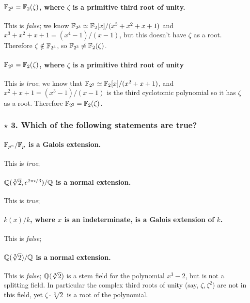 \paragraph*{$\mathbb{F}_{2^3} = \mathbb{F}_{2}(\zeta)$, where $\zeta$ is a primitive third root of unity.} This is \emph{false}; we know $\mathbb{F}_{2^3} \simeq \mathbb{F}_2[x] / (x^3 + x^2 + x + 1)$ and $x^3 + x^2 + x + 1 = (x^4 - 1) / (x - 1)$, but this doesn't have $\zeta$ as a root. Therefore $\zeta \notin \mathbb{F}_{2^3}$, so $\mathbb{F}_{2^3} \neq \mathbb{F}_2(\zeta)$.

\paragraph*{$\mathbb{F}_{2^2} = \mathbb{F}_{2}(\zeta)$, where $\zeta$ is a primitive third root of unity} This is \emph{true}; we know that $\mathbb{F}_{2^2} \simeq \mathbb{F}_2[x] / (x^2 + x + 1)$, and $x^2 + x + 1 = (x^3 - 1) / (x - 1)$ is the third cyclotomic polynomial so it has $\zeta$ as a root. Therefore $\mathbb{F}_{2^2} = \mathbb{F}_2(\zeta)$.

\subsubsection*{$\star$ 3. Which of the following statements are true?}
\paragraph*{$\mathbb{F}_{p^n} / \mathbb{F}_p$ is a Galois extension.} This is \emph{true}; %

\paragraph*{$\mathbb{Q}(\sqrt[3]{2}, e^{2\pi\imath / 3}) / \mathbb{Q}$ is a normal extension.} This is \emph{true}; %

\paragraph*{$k(x) / k$, where $x$ is an indeterminate, is a Galois extension of $k$.} This is \emph{false}; %

\paragraph*{$\mathbb{Q}(\sqrt[3]{2})/\mathbb{Q}$ is a normal extension.} This is \emph{false}; $\mathbb{Q}(\sqrt[3]{2})$ is a stem field for the polynomial $x^3 - 2$, but is not a splitting field. In particular the complex third roots of unity (say, $\zeta, \zeta^2$) are not in this field, yet $\zeta \cdot \sqrt[3]{2}$ is a root of the polynomial.

